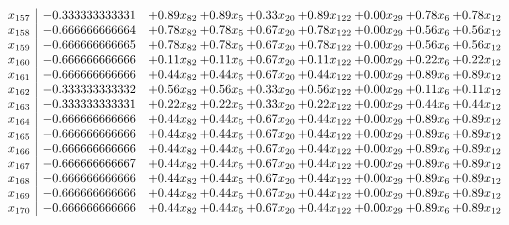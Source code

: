 \documentclass[8pt]{article}
\begin{document}
\[\begin{array}{c| c c@{\hskip 2pt} c@{\hskip 2pt} c@{\hskip 2pt} c@{\hskip 2pt} c@{\hskip 2pt} c@{\hskip 2pt} c@{\hskip 2pt} }
 x_{157}   &  -0.333333333331 & +  0.89 x_{82} & +  0.89 x_{5} & +  0.33 x_{20} & +  0.89 x_{122} & +  0.00 x_{29} & +  0.78 x_{6} & +  0.78 x_{12}\\
 x_{158}   &  -0.666666666664 & +  0.78 x_{82} & +  0.78 x_{5} & +  0.67 x_{20} & +  0.78 x_{122} & +  0.00 x_{29} & +  0.56 x_{6} & +  0.56 x_{12}\\
 x_{159}   &  -0.666666666665 & +  0.78 x_{82} & +  0.78 x_{5} & +  0.67 x_{20} & +  0.78 x_{122} & +  0.00 x_{29} & +  0.56 x_{6} & +  0.56 x_{12}\\
 x_{160}   &  -0.666666666666 & +  0.11 x_{82} & +  0.11 x_{5} & +  0.67 x_{20} & +  0.11 x_{122} & +  0.00 x_{29} & +  0.22 x_{6} & +  0.22 x_{12}\\
 x_{161}   &  -0.666666666666 & +  0.44 x_{82} & +  0.44 x_{5} & +  0.67 x_{20} & +  0.44 x_{122} & +  0.00 x_{29} & +  0.89 x_{6} & +  0.89 x_{12}\\
 x_{162}   &  -0.333333333332 & +  0.56 x_{82} & +  0.56 x_{5} & +  0.33 x_{20} & +  0.56 x_{122} & +  0.00 x_{29} & +  0.11 x_{6} & +  0.11 x_{12}\\
 x_{163}   &  -0.333333333331 & +  0.22 x_{82} & +  0.22 x_{5} & +  0.33 x_{20} & +  0.22 x_{122} & +  0.00 x_{29} & +  0.44 x_{6} & +  0.44 x_{12}\\
 x_{164}   &  -0.666666666666 & +  0.44 x_{82} & +  0.44 x_{5} & +  0.67 x_{20} & +  0.44 x_{122} & +  0.00 x_{29} & +  0.89 x_{6} & +  0.89 x_{12}\\
 x_{165}   &  -0.666666666666 & +  0.44 x_{82} & +  0.44 x_{5} & +  0.67 x_{20} & +  0.44 x_{122} & +  0.00 x_{29} & +  0.89 x_{6} & +  0.89 x_{12}\\
 x_{166}   &  -0.666666666666 & +  0.44 x_{82} & +  0.44 x_{5} & +  0.67 x_{20} & +  0.44 x_{122} & +  0.00 x_{29} & +  0.89 x_{6} & +  0.89 x_{12}\\
 x_{167}   &  -0.666666666667 & +  0.44 x_{82} & +  0.44 x_{5} & +  0.67 x_{20} & +  0.44 x_{122} & +  0.00 x_{29} & +  0.89 x_{6} & +  0.89 x_{12}\\
 x_{168}   &  -0.666666666666 & +  0.44 x_{82} & +  0.44 x_{5} & +  0.67 x_{20} & +  0.44 x_{122} & +  0.00 x_{29} & +  0.89 x_{6} & +  0.89 x_{12}\\
 x_{169}   &  -0.666666666666 & +  0.44 x_{82} & +  0.44 x_{5} & +  0.67 x_{20} & +  0.44 x_{122} & +  0.00 x_{29} & +  0.89 x_{6} & +  0.89 x_{12}\\
 x_{170}   &  -0.666666666666 & +  0.44 x_{82} & +  0.44 x_{5} & +  0.67 x_{20} & +  0.44 x_{122} & +  0.00 x_{29} & +  0.89 x_{6} & +  0.89 x_{12}\\

\end{array}\]
\end{document}
